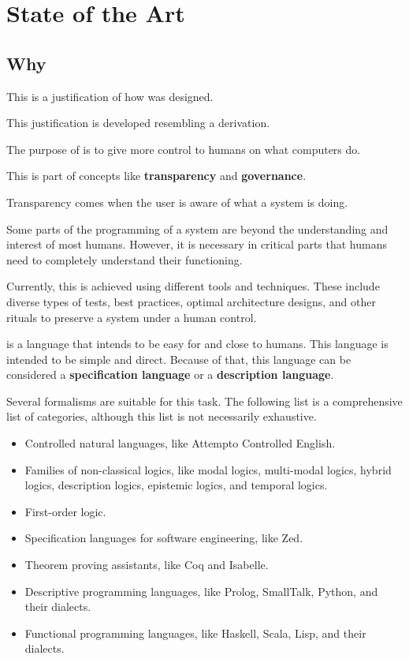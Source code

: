 \chapter{State of the Art}


\section{Why \Soda}

This is a justification of how \Soda was designed.

This justification is developed resembling a derivation.

The purpose of \Soda is to give more control to humans on what computers do.

This is part of concepts like \textbf{transparency} and \textbf{governance}.

Transparency comes when the user is aware of what a system is doing.

Some parts of the programming of a system are beyond the understanding and interest of most humans.
However, it is necessary in critical parts that humans need to completely understand their functioning.

Currently, this is achieved using different tools and techniques.
These include diverse types of tests, best practices, optimal architecture designs, and other rituals to preserve a system under a human control.

\Soda is a language that intends to be easy for and close to humans.
This language is intended to be simple and direct.
Because of that, this language can be considered a \textbf{specification language} or a \textbf{description language}.

Several formalisms are suitable for this task.
The following list is a comprehensive list of categories, although this list is not necessarily exhaustive.
\begin{itemize}
    \item Controlled natural languages, like Attempto Controlled English.
    \item Families of non-classical logics, like modal logics, multi-modal logics, hybrid logics, description logics, epistemic logics, and temporal logics.
    \item First-order logic.
    \item Specification languages for software engineering, like Zed.
    \item Theorem proving assistants, like Coq and Isabelle.
    \item Descriptive programming languages, like Prolog, SmallTalk, Python, and their dialects.
    \item Functional programming languages, like Haskell, Scala, Lisp, and their dialects.
\end{itemize}

